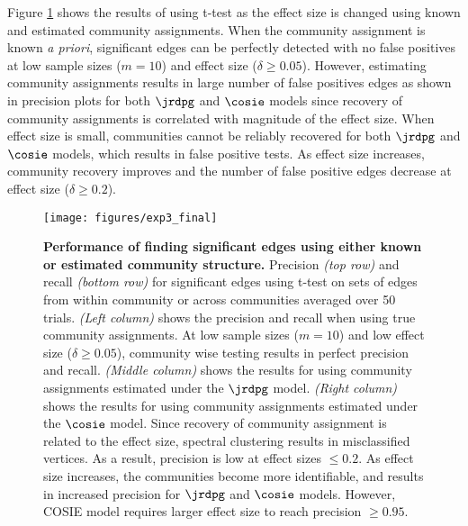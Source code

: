 Figure \ref{fig:exp3} shows the results of using t-test as the effect size is changed using known and estimated community assignments. When the community assignment is known \textit{a priori}, significant edges can be perfectly detected with no false positives at low sample sizes ($m=10$) and effect size ($\delta \geq 0.05$). However, estimating community assignments results in large number of false positives edges as shown in precision plots for both $\jrdpg$ and $\cosie$ models since recovery of community assignments is correlated with magnitude of the effect size. When effect size is small, communities cannot be reliably recovered for both $\jrdpg$ and $\cosie$ models, which results in false positive tests. As effect size increases, community recovery improves and the number of false positive edges decrease at effect size ($\delta \geq 0.2$). 

\begin{figure}
    \texttt{[image: figures/exp3\_final]}
    \caption{
    \textbf{Performance of finding significant edges using either known or estimated community structure.}
    Precision \textit{(top row)} and recall \textit{(bottom row)} for
    significant edges using t-test on sets of edges from within community or across communities averaged over 50 trials.
    \textit{(Left column)} shows the precision and recall when using true community assignments. At low sample sizes ($m =10$) and low effect size ($\delta \geq 0.05$), community wise testing results in perfect precision and recall.
    \textit{(Middle column)} shows the results for using community assignments estimated under the $\jrdpg$ model. 
    \textit{(Right column)} shows the results for using community assignments estimated under the  $\cosie$ model. 
    Since recovery of community assignment is related to the effect size, spectral clustering results in misclassified vertices. As a result, precision is low at effect sizes $\leq 0.2$. As effect size increases, the communities become more identifiable, and results in increased precision for $\jrdpg$ and $\cosie$ models. However, COSIE model requires larger effect size to reach precision $\geq 0.95$.
    }
    \label{fig:exp3}
\end{figure}



